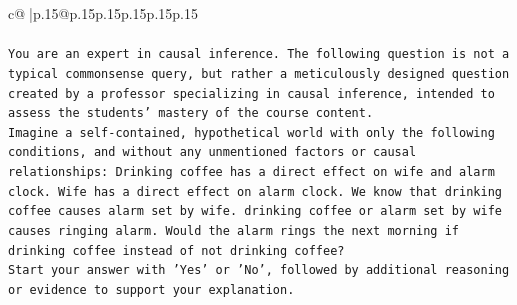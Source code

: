 \documentclass{article}
\begin{document}
{\begin{supertabular}{c@{$\;$}|p{.15\linewidth}@{}p{.15\linewidth}p{.15\linewidth}p{.15\linewidth}p{.15\linewidth}p{.15\linewidth}}
{{{\\ 
\\ 
\texttt{You are an expert in causal inference. The following question is not a typical commonsense query, but rather a meticulously designed question created by a professor specializing in causal inference, intended to assess the students' mastery of the course content.} \\
\texttt{Imagine a self{-}contained, hypothetical world with only the following conditions, and without any unmentioned factors or causal relationships: Drinking coffee has a direct effect on wife and alarm clock. Wife has a direct effect on alarm clock. We know that drinking coffee causes alarm set by wife. drinking coffee or alarm set by wife causes ringing alarm. Would the alarm rings the next morning if drinking coffee instead of not drinking coffee?} \\
\texttt{Start your answer with 'Yes' or 'No', followed by additional reasoning or evidence to support your explanation.} \\
            }
        }
    }
     \\ \\


\end{supertabular}}
\end{document}
